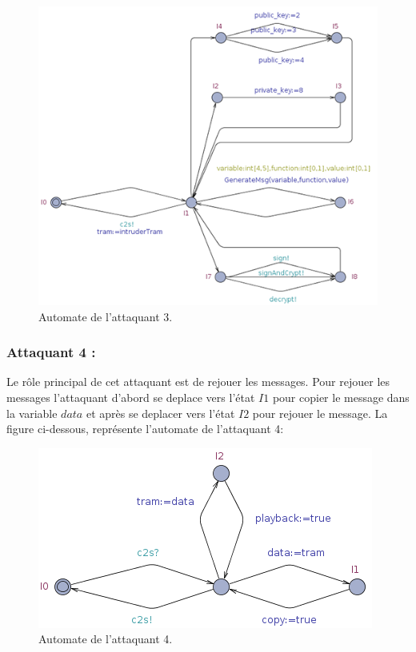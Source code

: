 \documentclass[10pt,a4paper]{article}
\begin{document}
\begin{figure}[!h]
\centering 
\includegraphics[scale=0.5]{img/attaquant3-500.png}
\caption{Automate de l'attaquant 3.}
\end{figure}

\subsubsection{Attaquant 4 :}
Le rôle principal de cet attaquant est de rejouer les messages. Pour rejouer les messages l'attaquant d'abord se deplace vers l'état $I1$ pour copier le message dans la variable $data$ et après se deplacer vers l'état $I2$ pour rejouer le message. La figure ci-dessous, représente l'automate de l'attaquant 4:  

\begin{figure}[!h]
\centering 
\includegraphics[scale=0.5]{img/attaquant4.png}
\caption{Automate de l'attaquant 4.}
\end{figure}
\end{document}
